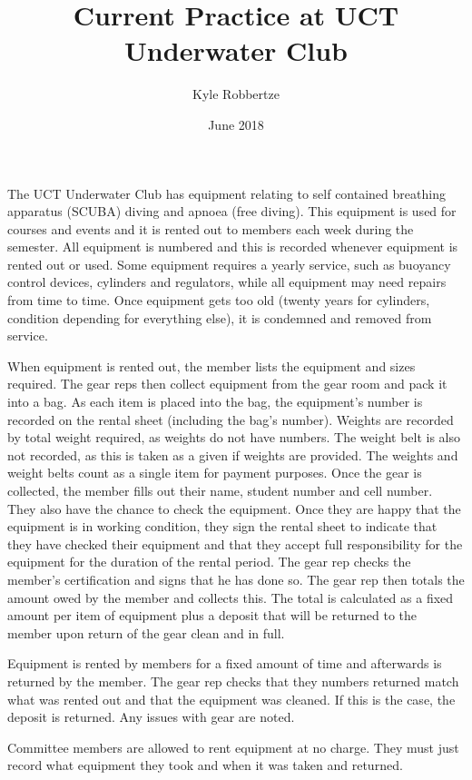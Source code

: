 \documentclass[12pt,a4paper]{article}
\begin{document}
\title{Current Practice at UCT Underwater Club}
\author{Kyle Robbertze}
\date{June 2018}
\maketitle

The UCT Underwater Club has equipment relating to self contained breathing
apparatus (SCUBA) diving and apnoea (free diving). This equipment is used for
courses and events and it is rented out to members each week during the
semester. All equipment is numbered and this is recorded whenever equipment is
rented out or used. Some equipment requires a yearly service, such as buoyancy
control devices, cylinders and regulators, while all equipment may need repairs
from time to time. Once equipment gets too old (twenty years for cylinders,
condition depending for everything else), it is condemned and removed from
service.

When equipment is rented out, the member lists the equipment and sizes required.
The gear reps then collect equipment from the gear room and pack it into a bag.
As each item is placed into the bag, the equipment's number is recorded on the
rental sheet (including the bag's number). Weights are recorded by total weight
required, as weights do not have numbers. The weight belt is also not recorded,
as this is taken as a given if weights are provided. The weights and weight
belts count as a single item for payment purposes. Once the gear is collected,
the member fills out their name, student number and cell number. They also have
the chance to check the equipment. Once they are happy that the equipment is in
working condition, they sign the rental sheet to indicate that they have checked
their equipment and that they accept full responsibility for the equipment for
the duration of the rental period. The gear rep checks the member's
certification and signs that he has done so. The gear rep then totals the amount
owed by the member and collects this. The total is calculated as a fixed amount
per item of equipment plus a deposit that will be returned to the member upon
return of the gear clean and in full.

Equipment is rented by members for a fixed amount of time and afterwards is
returned by the member. The gear rep checks that they numbers returned match
what was rented out and that the equipment was cleaned. If this is the case, the
deposit is returned. Any issues with gear are noted.

Committee members are allowed to rent equipment at no charge. They must just record
what equipment they took and when it was taken and returned.
\end{document}

